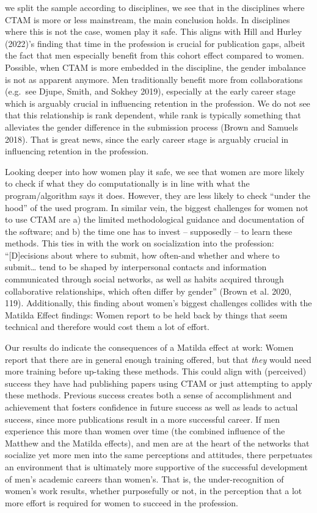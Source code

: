\documentclass[
]{ccr}
\begin{document}
we split the sample according to disciplines, we see that in the
disciplines where CTAM is more or less mainstream, the main conclusion
holds. In disciplines where this is not the case, women play it safe.
This aligns with Hill and Hurley (2022)'s finding that time in the
profession is crucial for publication gaps, albeit the fact that men
especially benefit from this cohort effect compared to women. Possible,
when CTAM is more embedded in the discipline, the gender imbalance is
not as apparent anymore. Men traditionally benefit more from
collaborations (e.g.~see Djupe, Smith, and Sokhey 2019), especially at
the early career stage which is arguably crucial in influencing
retention in the profession. We do not see that this relationship is
rank dependent, while rank is typically something that alleviates the
gender difference in the submission process (Brown and Samuels 2018).
That is great news, since the early career stage is arguably crucial in
influencing retention in the profession.

Looking deeper into how women play it safe, we see that women are more
likely to check if what they do computationally is in line with what the
program/algorithm says it does. However, they are less likely to check
``under the hood'' of the used program. In similar vein, the biggest
challenges for women not to use CTAM are a) the limited methodological
guidance and documentation of the software; and b) the time one has to
invest -- supposedly -- to learn these methods. This ties in with the
work on socialization into the profession: ``{[}D{]}ecisions about where
to submit, how often-and whether and where to submit\ldots{} tend to be
shaped by interpersonal contacts and information communicated through
social networks, as well as habits acquired through collaborative
relationships, which often differ by gender'' (Brown et al. 2020, 119).
Additionally, this finding about women's biggest challenges collides
with the Matilda Effect findings: Women report to be held back by things
that seem technical and therefore would cost them a lot of effort.

Our results do indicate the consequences of a Matilda effect at work:
Women report that there are in general enough training offered, but that
\emph{they} would need more training before up-taking these methods.
This could align with (perceived) success they have had publishing
papers using CTAM or just attempting to apply these methods. Previous
success creates both a sense of accomplishment and achievement that
fosters confidence in future success as well as leads to actual success,
since more publications result in a more successful career. If men
experience this more than women over time (the combined influence of the
Matthew and the Matilda effects), and men are at the heart of the
networks that socialize yet more men into the same perceptions and
attitudes, there perpetuates an environment that is ultimately more
supportive of the successful development of men's academic careers than
women's. That is, the under-recognition of women's work results, whether
purposefully or not, in the perception that a lot more effort is
required for women to succeed in the profession.
\end{document}
